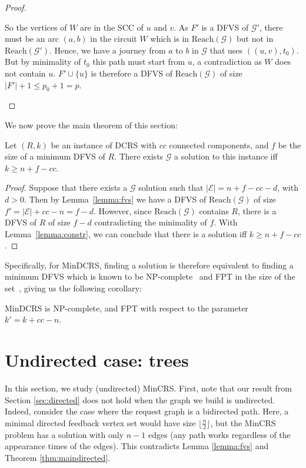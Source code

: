 \documentclass[11pt]{article}%
\begin{document}
\begin{proof}
\begin{itemize}
    So the vertices of $W$ are in the SCC of $u$ and $v$. As $F'$ is a DFVS of $\mathcal G'$, there must be an arc $(a,b)$ in the circuit $W$ which is in $\mathrm{Reach}(\mathcal G)$ but not in $\mathrm{Reach}(\mathcal G')$. Hence, we have a journey from $a$ to $b$ in $\mathcal G$ that uses $((u,v),t_0)$. But by minimality of $t_0$ this path must start from $u$, a contradiction as $W$ does not contain $u$.  
    $F' \cup \{u\}$ is therefore a DFVS of $\mathrm{Reach}(\mathcal G)$ of size $|F'| + 1 \leq p_0 + 1=p$.\qedhere
    \end{itemize}
  \end{proof}
  
  We now prove the main theorem of this section:
  \begin{theorem}
\label{thm:maindirected}
    Let $(R,k)$ be an instance of DCRS with $cc$ connected components, and $f$ be the size of a minimum DFVS of $R$. There exists $\mathcal G$ a solution to this instance iff $k \geq n + f - cc$.
  \end{theorem}
  \begin{proof}
    Suppose that there exists a $\mathcal G$ solution such that $|\mathcal E| = n+f-cc-d$, with $d > 0$. Then by Lemma~\ref{lemma:fvs} we have a DFVS of $\mathrm{Reach}(\mathcal G)$ of size $f'=|\mathcal E|+cc-n=f-d$. However, since $\mathrm{Reach}(\mathcal G)$ contains $R$, there is a DFVS of $R$ of size $f-d$ contradicting the minimality of $f$. With Lemma~\ref{lemma:constr}, we can conclude that there is a solution iff $k \geq n + f - cc$.
  \end{proof}
  Specifically, for MinDCRS, finding a solution is therefore equivalent to finding a minimum DFVS which is known to be NP-complete~\cite{Karp1972} and FPT in the size of the set~\cite{DFVSFPT}, giving us the following corollary:
  \begin{corollary}
    MinDCRS is NP-complete, and FPT with respect to the parameter $k'=k+cc-n$.
  \end{corollary}
  
\section{Undirected case: trees}
\label{sec:undirected}


In this section, we study (undirected) MinCRS. First, note that our result from Section \ref{sec:directed} does not hold when the graph we build is undirected. Indeed, consider the case where the request graph is a bidirected path. Here, a minimal directed feedback vertex set would have size $\lfloor \frac n 2 \rfloor$, but the MinCRS problem has a solution with only $n-1$ edges (any path works regardless of the appearance times of the edges). This contradicts Lemma \ref{lemma:fvs} and Theorem \ref{thm:maindirected}.
\end{document}
